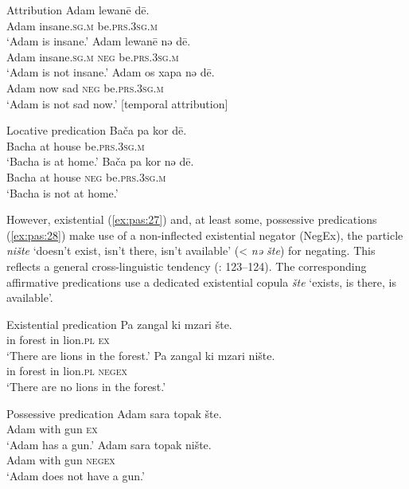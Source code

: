 \documentclass[output=paper,colorlinks,citecolor=brown]{langscibook}
\begin{document}
\ea\label{ex:pas:25} Attribution
    \ea\label{ex:pas:25a}
        \gll Adam lewan\={e}  d\={e}. \\
             Adam insane.\textsc{sg.m} be.\textsc{prs.3sg.m} \\
        \glt  ‘Adam is insane.’ 
    \ex\label{ex:pas:25b}
        \gll Adam lewan\={e}  nə d\={e}.  \\
             Adam insane.\textsc{sg.m} \textsc{neg} be.\textsc{prs.3sg.m}\\
        \glt ‘Adam is not insane.’
     \ex\label{ex:pas:25c}
        \gll Adam os xapa nə d\={e}.  \\
             Adam now sad \textsc{neg} be.\textsc{prs.3sg.m} \\
        \glt ‘Adam is not sad now.’ [temporal attribution] 
    \z
\z 

\ea\label{ex:pas:26} Locative predication
    \ea\label{ex:pas:26a}
        \gll Bača pa kor dē. \\
             Bacha at house be.\textsc{prs.3sg.m}\\
        \glt ‘Bacha is at home.’
    \ex\label{ex:pas:26b}
        \gll Bača pa kor nə dē. \\
             Bacha at house \textsc{neg} be.\textsc{prs.3sg.m}\\
        \glt ‘Bacha is not at home.’
    \z
\z 

However, existential (\ref{ex:pas:27}) and, at least some, possessive predications (\ref{ex:pas:28}) make use of a non-inflected existential negator (NegEx), the particle \textit{nište} ‘doesn’t exist, isn’t there, isn’t available’ (< \textit{nə šte}) for negating. This reflects a general cross-linguistic tendency (\citealt{Veselinova2013neg.exist}: 123–124). The corresponding affirmative predications use a dedicated existential copula \textit{šte} ‘exists, is there, is available’.

\ea\label{ex:pas:27} Existential predication
    \ea\label{ex:pas:27a}
        \gll Pa zangal ki mzari šte. \\
              in forest in lion.\textsc{pl} \textsc{ex}\\
        \glt ‘There are lions in the forest.’
    \ex\label{ex:pas:27b}
        \gll Pa zangal ki mzari nište.  \\
            in forest in lion.\textsc{pl} \textsc{negex}\\
        \glt ‘There are no lions in the forest.’ 
    \z
\z 

\ea\label{ex:pas:28} Possessive predication
    \ea\label{ex:pas:28a}
        \gll Adam sara topak šte. \\
              Adam with gun \textsc{ex}\\
        \glt ‘Adam has a gun.’
    \ex\label{ex:pas:28b}
        \gll Adam sara topak nište.  \\
            Adam with gun \textsc{negex}\\
        \glt ‘Adam does not have a gun.’
    \z
\z 
\end{document}
